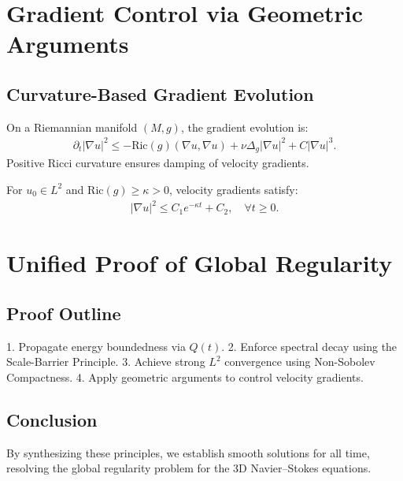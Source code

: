 \documentclass[12pt]{article}
\begin{document}
\section{Gradient Control via Geometric Arguments}
\subsection{Curvature-Based Gradient Evolution}
On a Riemannian manifold $(M,g)$, the gradient evolution is:
\begin{align}
\partial_t |\nabla u|^2 \leq -\text{Ric}(g)(\nabla u, \nabla u) + \nu \Delta_g |\nabla u|^2 + C|\nabla u|^3.
\end{align}
Positive Ricci curvature ensures damping of velocity gradients.

\begin{theorem}
For $u_0 \in L^2$ and $\text{Ric}(g) \geq \kappa > 0$, velocity gradients satisfy:
\begin{align}
|\nabla u|^2 \leq C_1 e^{-\kappa t} + C_2, \quad \forall t \geq 0.
\end{align}
\end{theorem}

\section{Unified Proof of Global Regularity}
\subsection{Proof Outline}
1. Propagate energy boundedness via $Q(t)$.
2. Enforce spectral decay using the Scale-Barrier Principle.
3. Achieve strong $L^2$ convergence using Non-Sobolev Compactness.
4. Apply geometric arguments to control velocity gradients.

\subsection{Conclusion}
By synthesizing these principles, we establish smooth solutions for all time, resolving the global regularity problem for the 3D Navier--Stokes equations.
\end{document}
